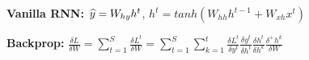 \textbf{Vanilla RNN:} $\widehat{y} = W_{hy} h^t$, $h^t = tanh(W_{hh} h^{t-1} + W_{xh} x^t)$

\textbf{Backprop:} $\frac{\delta L}{\delta W} 
= \sum_{t=1}^S \frac{\delta L^t}{\delta W}
= \sum_{t=1}^S \sum_{k=1}^t \frac{\delta L^t}{\delta y^t} \frac{\delta y^t}{\delta h^t} \frac{\delta h^t}{\delta h^k} \frac{\delta^+ h^k}{\delta W}$\\

